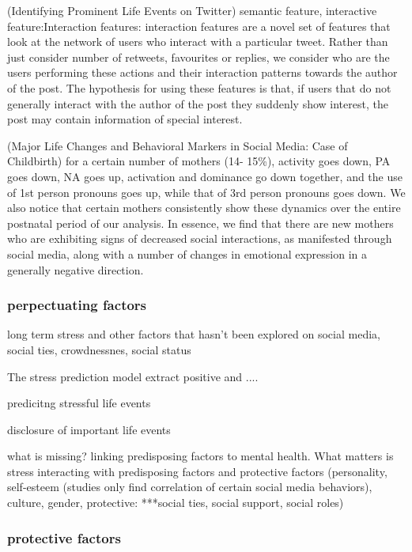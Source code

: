 (Identifying Prominent Life Events on Twitter)
semantic feature, interactive feature:Interaction features: interaction features are a novel
set of features that look at the network of users who
interact with a particular tweet. Rather than just consider
number of retweets, favourites or replies, we consider
who are the users performing these actions and
their interaction patterns towards the author of the
post. The hypothesis for using these features is that,
if users that do not generally interact with the author
of the post they suddenly show interest, the post may
contain information of special interest.


(Major Life Changes and Behavioral Markers in Social
Media: Case of Childbirth)
for a certain number of mothers (14-
15\%), activity goes down, PA goes down, NA goes up,
activation and dominance go down together, and the use of
1st person pronouns goes up, while that of 3rd person
pronouns goes down. We also notice that certain mothers
consistently show these dynamics over the entire postnatal
period of our analysis. In essence, we find that there are
new mothers who are exhibiting signs of decreased social
interactions, as manifested through social media, along with
a number of changes in emotional expression in a generally
negative direction.


\subsubsection{perpectuating factors}

long term stress and other factors that hasn't been explored on social media, social ties, crowdnessnes, social status



The stress prediction model extract positive and ....


predicitng stressful life events


disclosure of important life events


what is missing? linking predisposing factors to mental health. What matters is stress interacting with predisposing factors and protective factors 
(personality, self-esteem (studies only find correlation of certain social media behaviors), culture, gender, protective: ***social ties, social support, social roles)


\subsubsection{protective factors}

